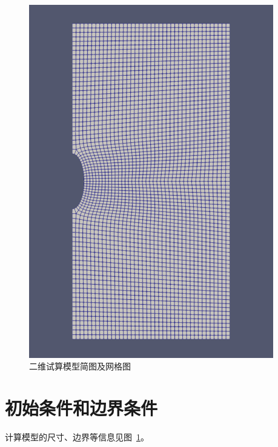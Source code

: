 \begin{figure}[ht!]
{\begin{minipage}{7cm}
            \includegraphics[width=0.95\textwidth]{img/chap4/2dmoxing.pdf}
        \end{minipage}
    }
    \caption{二维试算模型简图及网格图}
    \label{jiantu}
\end{figure}

\section{初始条件和边界条件}
计算模型的尺寸、边界等信息见图~\ref{jiantu}。

